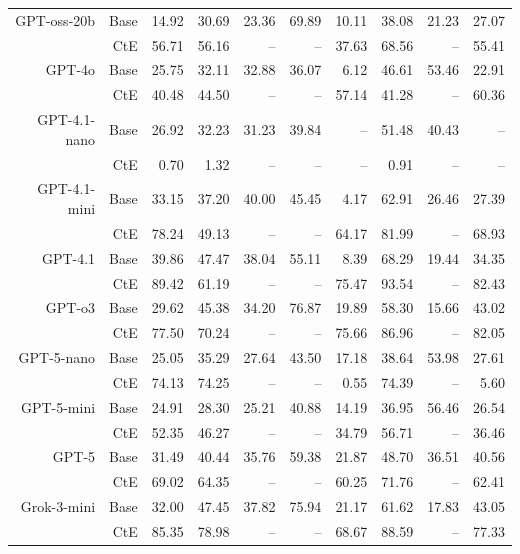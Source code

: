 \begin{table}[!t]
\begin{tabular}{r r !{\color{white!80!black} \vline} r r r r r !{\color{white!80!black} \vline} r r r}
\midrule
\sf GPT-oss-20b & Base & 14.92 & 30.69 & 23.36 & 69.89 & 10.11 & 38.08 & 21.23 & 27.07 \\
 & CtE & 56.71 & 56.16 & -- & -- & 37.63 & 68.56 & -- & 55.41 \\
\midrule
\sf GPT-4o & Base & 25.75 & 32.11 & 32.88 & 36.07 & 6.12 & 46.61 & 53.46 & 22.91 \\
 & CtE & 40.48 & 44.50 & -- & -- & 57.14 & 41.28 & -- & 60.36 \\
\midrule
\sf GPT-4.1-nano & Base & 26.92 & 32.23 & 31.23 & 39.84 & -- & 51.48 & 40.43 & -- \\
 & CtE & 0.70 & 1.32 & -- & -- & -- & 0.91 & -- & -- \\
\midrule
\sf GPT-4.1-mini & Base & 33.15 & 37.20 & 40.00 & 45.45 & 4.17 & 62.91 & 26.46 & 27.39 \\
 & CtE & 78.24 & 49.13 & -- & -- & 64.17 & 81.99 & -- & 68.93 \\
\midrule
\sf GPT-4.1 & Base & 39.86 & 47.47 & 38.04 & 55.11 & 8.39 & 68.29 & 19.44 & 34.35 \\
 & CtE & 89.42 & 61.19 & -- & -- & 75.47 & 93.54 & -- & 82.43 \\
\midrule
\sf GPT-o3 & Base & 29.62 & 45.38 & 34.20 & 76.87 & 19.89 & 58.30 & 15.66 & 43.02 \\
 & CtE & 77.50 & 70.24 & -- & -- & 75.66 & 86.96 & -- & 82.05 \\
\midrule
\sf GPT-5-nano & Base & 25.05 & 35.29 & 27.64 & 43.50 & 17.18 & 38.64 & 53.98 & 27.61 \\
 & CtE & 74.13 & 74.25 & -- & -- & 0.55 & 74.39 & -- & 5.60 \\
\midrule
\sf GPT-5-mini & Base & 24.91 & 28.30 & 25.21 & 40.88 & 14.19 & 36.95 & 56.46 & 26.54 \\
 & CtE & 52.35 & 46.27 & -- & -- & 34.79 & 56.71 & -- & 36.46 \\
\midrule
\sf GPT-5 & Base & 31.49 & 40.44 & 35.76 & 59.38 & 21.87 & 48.70 & 36.51 & 40.56 \\
 & CtE & 69.02 & 64.35 & -- & -- & 60.25 & 71.76 & -- & 62.41 \\
\midrule
\sf Grok-3-mini & Base & 32.00 & 47.45 & 37.82 & 75.94 & 21.17 & 61.62 & 17.83 & 43.05 \\
 & CtE & 85.35 & 78.98 & -- & -- & 68.67 & 88.59 & -- & 77.33 \\
\bottomrule
\end{tabular}
\label{tab:cRi+}
\end{table}